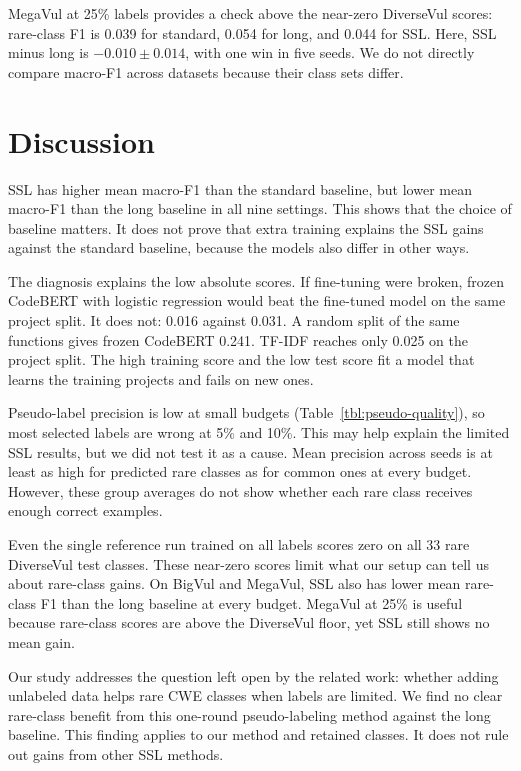 \documentclass[conference]{IEEEtran}
\begin{document}
MegaVul at 25\% labels provides a check above the near-zero DiverseVul
scores: rare-class F1 is 0.039 for standard, 0.054 for long, and 0.044
for SSL. Here, SSL minus long is \(-0.010\pm0.014\), with one win in
five seeds. We do not directly compare macro-F1 across datasets because
their class sets differ.

\section{Discussion}\label{discussion}

SSL has higher mean macro-F1 than the standard baseline, but lower mean
macro-F1 than the long baseline in all nine settings. This shows that
the choice of baseline matters. It does not prove that extra training
explains the SSL gains against the standard baseline, because the models
also differ in other ways.

The diagnosis explains the low absolute scores. If fine-tuning were broken, frozen CodeBERT with logistic regression would beat the fine-tuned model on the same project split. It does not: 0.016 against 0.031. A random split of the same functions gives frozen CodeBERT 0.241. TF-IDF reaches only 0.025 on the project split. The high training score and the low test score fit a model that learns the training projects and fails on new ones.

Pseudo-label precision is low at small budgets
(Table~\ref{tbl:pseudo-quality}), so most selected labels are wrong at
5\% and 10\%. This may help explain the limited SSL results, but we did
not test it as a cause. Mean precision across seeds is at least as high
for predicted rare classes as for common ones at every budget. However,
these group averages do not show whether each rare class receives enough
correct examples.

Even the single reference run trained on all labels scores zero on all
33 rare DiverseVul test classes. These near-zero scores limit what our
setup can tell us about rare-class gains. On BigVul and MegaVul, SSL
also has lower mean rare-class F1 than the long baseline at every
budget. MegaVul at 25\% is useful because rare-class scores are above
the DiverseVul floor, yet SSL still shows no mean gain.

Our study addresses the question left open by the related work: whether
adding unlabeled data helps rare CWE classes when labels are limited. We
find no clear rare-class benefit from this one-round pseudo-labeling
method against the long baseline. This finding applies to our method and
retained classes. It does not rule out gains from other SSL methods.
\end{document}
